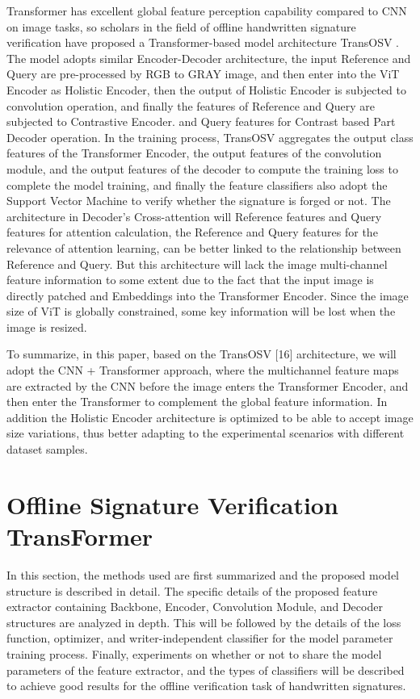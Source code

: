 \documentclass{article}
\begin{document}
Transformer has excellent global feature perception capability compared to CNN on image tasks, so scholars in the field of offline handwritten signature verification have proposed a Transformer-based model architecture TransOSV \cite{16}. The model adopts similar Encoder-Decoder architecture, the input Reference and Query are pre-processed by RGB to GRAY image, and then enter into the ViT Encoder as Holistic Encoder, then the output of Holistic Encoder is subjected to convolution operation, and finally the features of Reference and Query are subjected to Contrastive Encoder. and Query features for Contrast based Part Decoder operation. In the training process, TransOSV aggregates the output class features of the Transformer Encoder, the output features of the convolution module, and the output features of the decoder to compute the training loss to complete the model training, and finally the feature classifiers also adopt the Support Vector Machine to verify whether the signature is forged or not. The architecture in Decoder's Cross-attention will Reference features and Query features for attention calculation, the Reference and Query features for the relevance of attention learning, can be better linked to the relationship between Reference and Query. But this architecture will lack the image multi-channel feature information to some extent due to the fact that the input image is directly patched and Embeddings into the Transformer Encoder. Since the image size of ViT is globally constrained, some key information will be lost when the image is resized.

To summarize, in this paper, based on the TransOSV [16] architecture, we will adopt the CNN + Transformer approach, where the multichannel feature maps are extracted by the CNN before the image enters the Transformer Encoder, and then enter the Transformer to complement the global feature information. In addition the Holistic Encoder architecture is optimized to be able to accept image size variations, thus better adapting to the experimental scenarios with different dataset samples.



\newpage
\section{Offline Signature Verification TransFormer}

In this section, the methods used are first summarized and the proposed model structure is described in detail. The specific details of the proposed feature extractor containing Backbone, Encoder, Convolution Module, and Decoder structures are analyzed in depth. This will be followed by the details of the loss function, optimizer, and writer-independent classifier \cite{17} for the model parameter training process. Finally, experiments on whether or not to share the model parameters of the feature extractor, and the types of classifiers will be described to achieve good results for the offline verification task of handwritten signatures.
\end{document}
